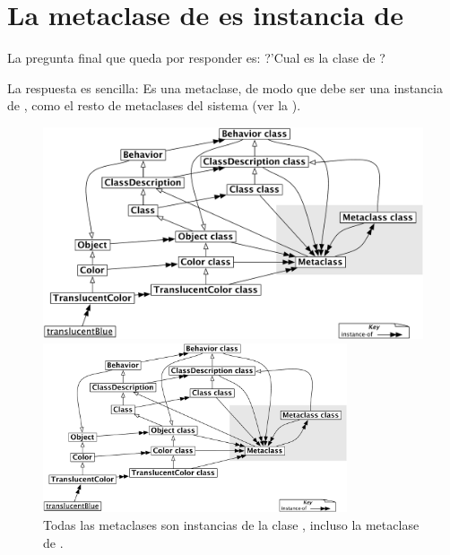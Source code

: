 \documentclass[a4paper,10pt,twoside]{book}
\begin{document}
\section{La metaclase de  es instancia de }

La pregunta final que queda por responder es: ?'Cual es la clase de ?

La respuesta es sencilla: Es una metaclase, de modo que debe ser una instancia de , como el resto de metaclases del sistema (ver la ).

\begin{center}
\begin{figure}
\ifluluelse
	{\centerline{\includegraphics[width=\textwidth]{TranslucentMetaclassClassClass}}}
	{\centerline{\includegraphics[width=0.8\textwidth]{TranslucentMetaclassClassClass}}}
\caption{Todas las metaclases son instancias de la clase , incluso la metaclase de .}
\end{figure}
\end{center}
\end{document}
